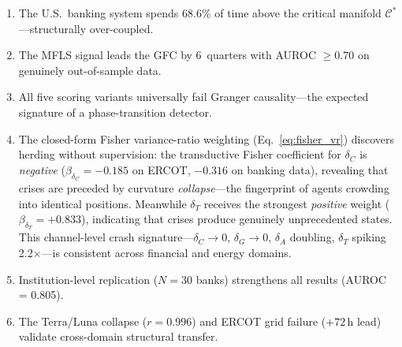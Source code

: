\documentclass[final]{siamltex}
\newcommand{\Cman}{\mathcal{C}^*}
\begin{document}
\begin{enumerate}
\item The U.S.\ banking system spends 68.6\% of time above the
  critical manifold $\Cman$---structurally over-coupled.

\item The MFLS signal leads the GFC by 6~quarters with
  AUROC $\ge 0.70$ on genuinely out-of-sample data.

\item All five scoring variants universally fail Granger
  causality---the expected signature of a phase-transition detector.

\item The closed-form Fisher variance-ratio weighting
  (Eq.~\ref{eq:fisher_vr}) discovers herding without supervision:
  the transductive Fisher coefficient for $\delta_C$ is
  \emph{negative} ($\beta_{\delta_C}=-0.185$ on ERCOT,
  $-0.316$ on banking data), revealing that crises are preceded by
  curvature \emph{collapse}---the fingerprint of agents crowding
  into identical positions.  Meanwhile $\delta_T$ receives the
  strongest \emph{positive} weight ($\beta_{\delta_T}=+0.833$),
  indicating that crises produce genuinely unprecedented states.
  This channel-level crash signature---$\delta_C\to 0$,
  $\delta_G\to 0$, $\delta_A$ doubling, $\delta_T$ spiking
  2.2$\times$---is consistent across financial and energy domains.

\item Institution-level replication ($N=30$ banks) strengthens all
  results (AUROC = 0.805).

\item The Terra/Luna collapse ($r=0.996$) and ERCOT grid failure
  ($+72$\,h lead) validate cross-domain structural transfer.


\end{enumerate}
\end{document}
